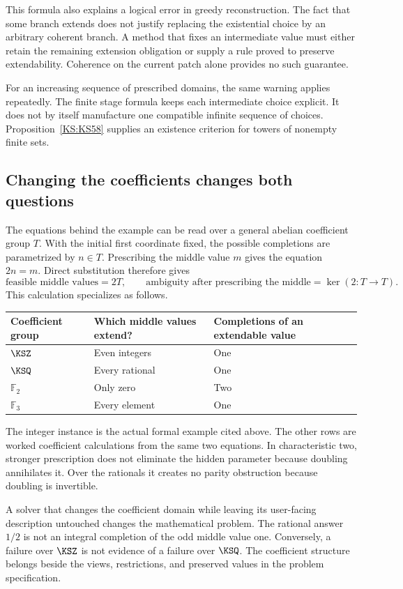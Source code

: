 This formula also explains a logical error in greedy reconstruction. The fact that some branch extends does not justify replacing the existential choice by an arbitrary coherent branch. A method that fixes an intermediate value must either retain the remaining extension obligation or supply a rule proved to preserve extendability. Coherence on the current patch alone provides no such guarantee.

For an increasing sequence of prescribed domains, the same warning applies repeatedly. The finite stage formula keeps each intermediate choice explicit. It does not by itself manufacture one compatible infinite sequence of choices. Proposition~\ref{KS:KS58} supplies an existence criterion for towers of nonempty finite sets.

\subsection{Changing the coefficients changes both questions}
The equations behind the example can be read over a general abelian coefficient group \(T\). With the initial first coordinate fixed, the possible completions are parametrized by \(n\in T\). Prescribing the middle value \(m\) gives the equation \(2n=m\). Direct substitution therefore gives
\[
 \text{feasible middle values}=2T,\qquad
 \text{ambiguity after prescribing the middle}=\ker(2:T\to T).
\]
This calculation specializes as follows.
\begin{center}
\begin{tabular}{@{}lll@{}}
\toprule
Coefficient group & Which middle values extend? & Completions of an extendable value\\
\midrule
\(\KSZ\) & Even integers & One\\
\(\KSQ\) & Every rational & One\\
\(\mathbb F_2\) & Only zero & Two\\
\(\mathbb F_3\) & Every element & One\\
\bottomrule
\end{tabular}
\end{center}
The integer instance is the actual formal example cited above. The other rows are worked coefficient calculations from the same two equations. In characteristic two, stronger prescription does not eliminate the hidden parameter because doubling annihilates it. Over the rationals it creates no parity obstruction because doubling is invertible.

A solver that changes the coefficient domain while leaving its user-facing description untouched changes the mathematical problem. The rational answer \(1/2\) is not an integral completion of the odd middle value one. Conversely, a failure over \(\KSZ\) is not evidence of a failure over \(\KSQ\). The coefficient structure belongs beside the views, restrictions, and preserved values in the problem specification.

